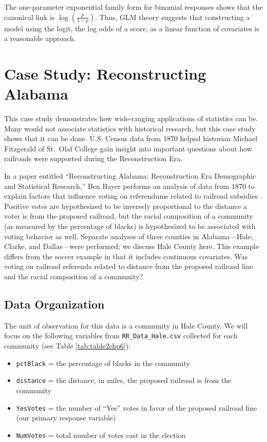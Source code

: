 \documentclass[
]{krantz}
\begin{document}
The one-parameter exponential family form for binomial responses shows that the canonical link is \(\log\left(\frac{p}{1-p}\right)\). Thus, GLM theory suggests that constructing a model using the logit, the log odds of a score, as a linear function of covariates is a reasonable approach.

\hypertarget{case-study-reconstructing-alabama}{%
\section{Case Study: Reconstructing Alabama}\label{case-study-reconstructing-alabama}}

This case study demonstrates how wide-ranging applications of statistics can be. Many would not associate statistics with historical research, but this case study shows that it can be done. U.S. Census data from 1870 helped historian Michael Fitzgerald of St.~Olaf College gain insight into important questions about how railroads were supported during the Reconstruction Era.

In a paper entitled ``Reconstructing Alabama: Reconstruction Era Demographic and Statistical Research,'' Ben Bayer performs an analysis of data from 1870 to explain factors that influence voting on referendums related to railroad subsidies \citep{Bayer2011}. Positive votes are hypothesized to be inversely proportional to the distance a voter is from the proposed railroad, but the racial composition of a community (as measured by the percentage of blacks) is hypothesized to be associated with voting behavior as well. Separate analyses of three counties in Alabama---Hale, Clarke, and Dallas---were performed; we discuss Hale County here. This example differs from the soccer example in that it includes continuous covariates. Was voting on railroad referenda related to distance from the proposed railroad line and the racial composition of a community?

\hypertarget{data-organization-3}{%
\subsection{Data Organization}\label{data-organization-3}}

The unit of observation for this data is a community in Hale County. We will focus on the following variables from \texttt{RR\_Data\_Hale.csv} collected for each community (see Table \ref{tab:table2chp6}):

\begin{itemize}
\item
  \texttt{pctBlack} = the percentage of blacks in the community
\item
  \texttt{distance} = the distance, in miles, the proposed railroad is from the community
\item
  \texttt{YesVotes} = the number of ``Yes'' votes in favor of the proposed railroad line (our primary response variable)
\item
  \texttt{NumVotes} = total number of votes cast in the election
\end{itemize}
\end{document}
